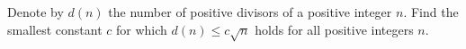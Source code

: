 Denote by $d(n)$ the number of positive divisors of a positive integer $n$. Find the smallest constant $c$ for which $d(n)\le c\sqrt n$ holds for all positive integers $n$.
